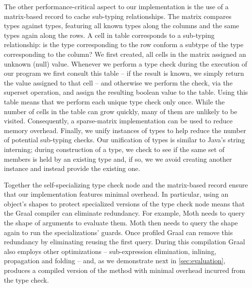 The other performance-critical aspect to our implementation
is the use of a matrix-based record to cache sub-typing relationships.
The matrix compares types against types,
featuring all known types along the columns and the same types again along the rows.
A cell in table corresponds to a sub-typing relationship:
is the type corresponding to the row conform a subtype of the type corresponding to the column?
We first created, all cells in the matrix assigned an unknown (null) value.
Whenever we perform a type check during the execution of our program we 
first consult this table
-- if the result is known, we simply return the value assigned to that cell --
and otherwise we perform the check, via the superset operation,
and assign the resulting boolean value to the table.
Using this table means that we perform each unique type check only once.
While the number of cells in the table can grow quickly,
many of them are unlikely to be visited. 
Consequently, a sparse-matrix implementation can be used to reduce memory overhead.
Finally,
we unify instances of types to help reduce the number of potential sub-typing checks.
Our unification of types is similar to Java's string interning; 
during construction of a type,
we check to see if the same set of members is held
by an existing type and, if so,
we we avoid creating another instance and instead
provide the existing one.

Together the self-specializing type check node and the matrix-based record
ensure that our implementation features minimal overhead. 
In particular, using an object's shapes
to protect specialized versions of the type check node 
means that the Graal compiler can eliminate redundancy. For example,
Moth needs to query the shape of arguments to evaluate them.
Moth then needs to query the shape again to run the specializations' guards.
Once profiled Graal can remove this redundancy by eliminating
reusing the first query.
During this compilation Graal also employs other optimizations 
-- sub-expression elimination, inlining, propagation and folding --\tabularnewline
and, as we demonstrate next in \cref{sec:evaluation},
produces a compiled version of the method with minimal overhead incurred from
the type check.
